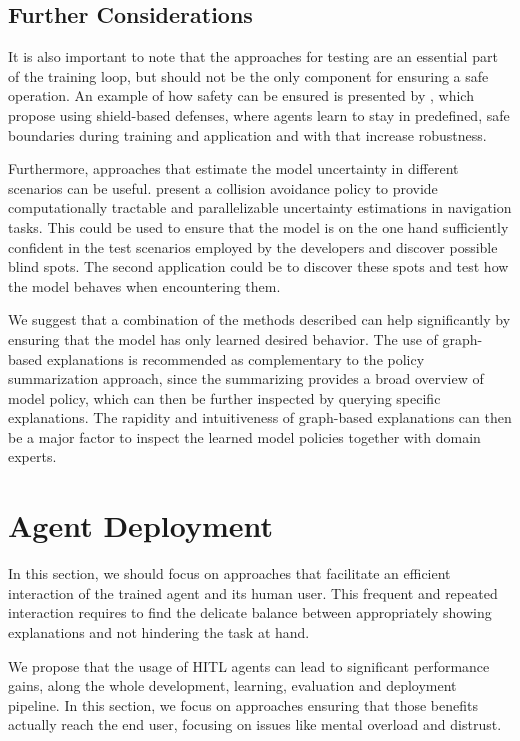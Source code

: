 \documentclass[twoside,11pt]{article}
\begin{document}
\subsection{Further Considerations}
It is also important to note that the approaches for testing are an essential part of the training loop, but should not be the only component for ensuring a safe operation. An example of how safety can be ensured is presented by \citep{XiongEtAl:2020:Robustness}, which propose using shield-based defenses, where agents learn to stay in predefined, safe boundaries during training and application and with that increase robustness.

Furthermore, approaches that estimate the model uncertainty in different scenarios can be useful. \citet{LuetjensEverettHow:2018:RLModelUncertainty} present a collision avoidance policy to provide computationally tractable and parallelizable uncertainty estimations in navigation tasks. This could be used to ensure that the model is on the one hand sufficiently confident in the test scenarios employed by the developers and discover possible blind spots. The second application could be to discover these spots and test how the model behaves when encountering them.

We suggest that a combination of the methods described can help significantly by ensuring that the model has only learned desired behavior. The use of graph-based explanations is recommended as complementary to the policy summarization approach, since the summarizing provides a broad overview of model policy, which can then be further inspected by querying specific explanations. The rapidity and intuitiveness of graph-based explanations can then be a major factor to inspect the learned model policies together with domain experts.

\section{Agent Deployment}
\label{sec:Deployment}

In this section, we should focus on approaches that facilitate an efficient interaction of the trained agent and its human user. This frequent and repeated interaction requires to find the delicate balance between appropriately showing explanations and not hindering the task at hand.

We propose that the usage of HITL agents can lead to significant performance gains, along the whole development, learning, evaluation and deployment pipeline. In this section, we focus on approaches ensuring that those benefits actually reach the end user, focusing on issues like mental overload and distrust.
\end{document}
